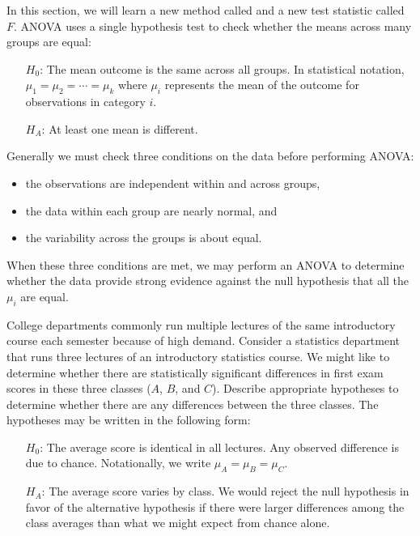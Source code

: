In this section, we will learn a new method called  and a new test statistic called $F$. ANOVA uses a single hypothesis test to check whether the means across many groups are equal:
\begin{itemize}
\setlength{\itemsep}{0mm}
\item[$H_0$:] The mean outcome is the same across all groups. In statistical notation, $\mu_1 = \mu_2 = \cdots = \mu_k$ where $\mu_i$ represents the mean of the outcome for observations in category $i$.
\item[$H_A$:] At least one mean is different.
\end{itemize}
Generally we must check three conditions on the data before performing ANOVA:
\begin{itemize}
\setlength{\itemsep}{0mm}
\item the observations are independent within and across groups,
\item the data within each group are nearly normal, and
\item the variability across the groups is about equal.
\end{itemize}
When these three conditions are met, we may perform an ANOVA to determine whether the data provide strong evidence against the null hypothesis that all the $\mu_i$ are equal.

\begin{example}{College departments commonly run multiple lectures of the same introductory course each semester because of high demand. Consider a statistics department that runs three lectures of an introductory statistics course. We might like to determine whether there are statistically significant differences in first exam scores in these three classes ($A$, $B$, and $C$). Describe appropriate hypotheses to determine whether there are any differences between the three classes.} \label{firstExampleForThreeStatisticsClassesAndANOVA}
The hypotheses may be written in the following form:
\begin{itemize}
\setlength{\itemsep}{0mm}
\item[$H_0$:] The average score is identical in all lectures. Any observed difference is due to chance. Notationally, we write $\mu_A=\mu_B=\mu_C$.
\item[$H_A$:] The average score varies by class. We would reject the null hypothesis in favor of the alternative hypothesis if there were larger differences among the class averages than what we might expect from chance alone.
\end{itemize}
\end{example}

